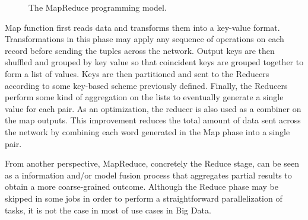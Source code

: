 \documentclass[3p,review]{elsarticle}
\begin{document}
\begin{figure}[!ht]
\centering {} \caption{The MapReduce programming model.}
\label{fig:mapreduce}
\end{figure}

Map function first reads data and transforms them into a key-value format. Transformations in this phase may apply any sequence of operations on each record before sending the tuples across the network. Output keys are then shuffled and grouped by key value so that coincident keys are grouped together to form a list of values. Keys are then partitioned and sent to the Reducers according to some key-based scheme previously defined. Finally, the Reducers perform some kind of aggregation on the lists to eventually generate a single value for each pair. As an optimization, the reducer is also used as a combiner on the map outputs. This improvement reduces the total amount of data sent across the network by combining each word generated in the Map phase into a single pair.


From another perspective, MapReduce, concretely the Reduce stage, can be seen as a information and/or model fusion process that aggregates partial results to obtain a more coarse-grained outcome. Although the Reduce phase may be skipped in some jobs in order to perform a straightforward parallelization of tasks, it is not the case in most of use cases in Big Data. 
\end{document}
